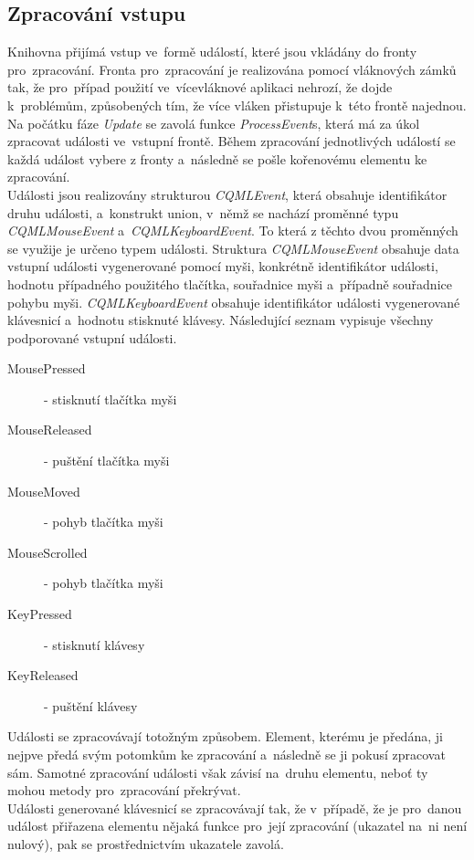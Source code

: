 \documentclass[11pt,twoside,a4paper]{book}
\begin{document}
\subsection{\label{SEC:input}Zpracování vstupu}
Knihovna přijímá vstup ve~formě událostí, které jsou vkládány do fronty pro~zpracování. Fronta pro~zpracování je realizována pomocí vláknových zámků tak, že pro~případ použití ve~vícevláknové aplikaci nehrozí, že dojde k~problémům, způsobených tím, že více vláken přistupuje k~této frontě najednou.
Na počátku fáze \textit{Update} se zavolá funkce \textit{ProcessEvent}s, která má za úkol zpracovat události ve~vstupní frontě. Během zpracování jednotlivých událostí se každá událost vybere z fronty a~následně se pošle kořenovému elementu ke zpracování. \\
Události jsou realizovány strukturou \textit{CQMLEvent}, která obsahuje identifikátor druhu události, a~konstrukt union, v~němž se nachází proměnné typu \textit{CQMLMouseEvent} a~\textit{CQMLKeyboardEvent}. To která z těchto dvou proměnných se využije je určeno typem události. Struktura \textit{CQMLMouseEvent} obsahuje data vstupní události vygenerované pomocí myši, konkrétně identifikátor události, hodnotu případného použitého tlačítka, souřadnice myši a~případně souřadnice pohybu myši. \textit{CQMLKeyboardEvent} obsahuje identifikátor události vygenerované klávesnicí a~hodnotu stisknuté klávesy. Následující seznam vypisuje všechny podporované vstupní události.
\begin{description}
\item[MousePressed] - stisknutí tlačítka myši
\item[MouseReleased] - puštění tlačítka myši
\item[MouseMoved] - pohyb tlačítka myši
\item[MouseScrolled] - pohyb tlačítka myši
\item[KeyPressed] - stisknutí klávesy
\item[KeyReleased] - puštění klávesy
\end{description}
Události se zpracovávají totožným způsobem. Element, kterému je předána, ji nejpve předá svým potomkům ke zpracování a~následně se ji pokusí zpracovat sám. Samotné zpracování události však závisí na~druhu elementu, neboť ty mohou metody pro~zpracování překrývat. \\
Události generované klávesnicí se zpracovávají tak, že v~případě, že je pro~danou událost přiřazena elementu nějaká funkce pro~její zpracování (ukazatel na~ni není nulový), pak se prostřednictvím ukazatele zavolá.\\
\end{document}
